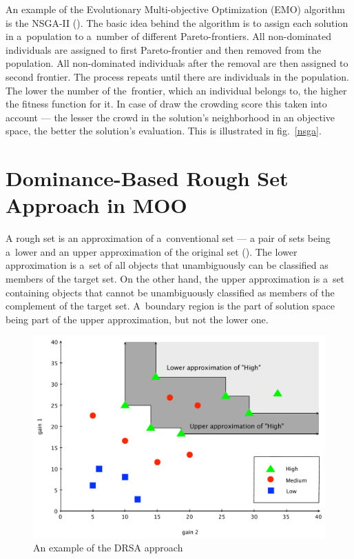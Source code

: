An example of the Evolutionary Multi-objective Optimization (EMO) algorithm is
the NSGA-II (\cite{Deb00}). The basic idea behind the algorithm is to assign
each solution in a~population to a~number of different Pareto-frontiers. All
non-dominated individuals are assigned to first Pareto-frontier and then
removed from the population. All non-dominated individuals after the removal
are then assigned to second frontier. The process repeats until there are
individuals in the population. The lower the number of the~frontier, which an
individual belongs to, the higher the fitness function for it. In case of draw
the crowding score this taken into account --- the lesser the crowd in the
solution's neighborhood in an objective space, the better the solution's
evaluation. This is illustrated in fig.~\ref{nsga}.


\section{Dominance-Based Rough Set Approach in MOO}
\label{sec_drsa_in_moo}

A rough set is an approximation of a~conventional set --- a pair of sets being
a~lower and an upper approximation of the original set (\cite{Paw82}). The
lower approximation is a~set of all objects that unambiguously can be
classified as members of the target set. On the other hand, the upper
approximation is a~set containing objects that cannot be unambiguously
classified as members of the complement of the target set.  A~boundary region
is the part of solution space being part of the upper approximation, but not
the lower one.

\begin{figure}
  \centering \includegraphics[scale=0.5]{img/drsa}
  \caption{An example of the DRSA approach}
  \label{drsa}
\end{figure}

